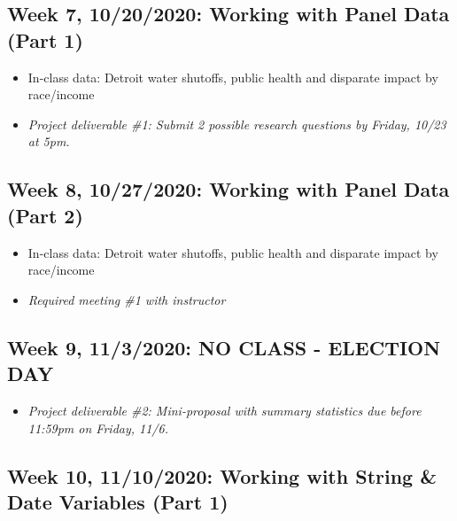 \documentclass[11pt,]{article}
\providecommand{\tightlist}{%
  \setlength{\itemsep}{0pt}\setlength{\parskip}{0pt}}
\begin{document}
\hypertarget{week-7-10202020-working-with-panel-data-part-1}{%
\subsection{Week 7, 10/20/2020: Working with Panel Data (Part
1)}\label{week-7-10202020-working-with-panel-data-part-1}}

\begin{itemize}
\tightlist
\item
  In-class data: Detroit water shutoffs, public health and disparate
  impact by race/income
\item
  \emph{Project deliverable \#1: Submit 2 possible research questions by
  Friday, 10/23 at 5pm.} \medskip
\end{itemize}

\hypertarget{week-8-10272020-working-with-panel-data-part-2}{%
\subsection{Week 8, 10/27/2020: Working with Panel Data (Part
2)}\label{week-8-10272020-working-with-panel-data-part-2}}

\begin{itemize}
\tightlist
\item
  In-class data: Detroit water shutoffs, public health and disparate
  impact by race/income
\item
  \emph{Required meeting \#1 with instructor} \medskip
\end{itemize}

\hypertarget{week-9-1132020-no-class---election-day}{%
\subsection{Week 9, 11/3/2020: NO CLASS - ELECTION
DAY}\label{week-9-1132020-no-class---election-day}}

\begin{itemize}
\tightlist
\item
  \emph{Project deliverable \#2: Mini-proposal with summary statistics
  due before 11:59pm on Friday, 11/6.} \medskip
\end{itemize}

\hypertarget{week-10-11102020-working-with-string-date-variables-part-1}{%
\subsection{Week 10, 11/10/2020: Working with String \& Date Variables
(Part
1)}\label{week-10-11102020-working-with-string-date-variables-part-1}}
\end{document}
